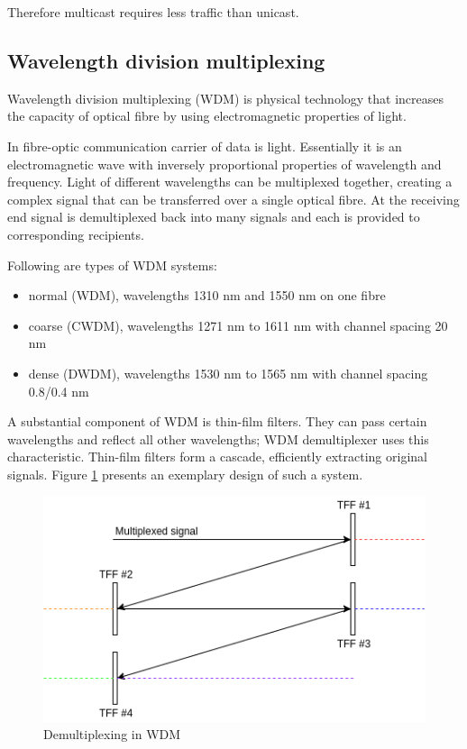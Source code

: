 \documentclass[conference]{IEEEtran}
\begin{document}
Therefore multicast requires less traffic than unicast.

\subsection{Wavelength division multiplexing}
Wavelength division multiplexing (WDM) is physical technology that increases the capacity of optical fibre by using electromagnetic properties of light.

In fibre-optic communication carrier of data is light. Essentially it is an electromagnetic wave with inversely proportional properties of wavelength and frequency. Light of different wavelengths can be multiplexed together, creating a complex signal that can be transferred over a single optical fibre. At the receiving end signal is demultiplexed back into many signals and each is provided to corresponding recipients.

Following are types of WDM systems:
\begin{itemize}
	\item normal (WDM), wavelengths 1310 nm and 1550 nm on one fibre
	\item coarse (CWDM), wavelengths 1271 nm to 1611 nm with channel spacing 20 nm
	\item dense (DWDM), wavelengths 1530 nm to 1565 nm with channel spacing 0.8/0.4 nm
\end{itemize}

A substantial component of WDM is thin-film filters. They can pass certain wavelengths and reflect all other wavelengths; WDM demultiplexer uses this characteristic. Thin-film filters form a cascade, efficiently extracting original signals. Figure \ref{demultiplexing} presents an exemplary design of such a system.

\begin{figure}[htbp]
	\centerline{\includegraphics[scale=0.5]{demultiplexer.png}}
	\caption{Demultiplexing in WDM}
	\label{demultiplexing}
\end{figure}
\end{document}
